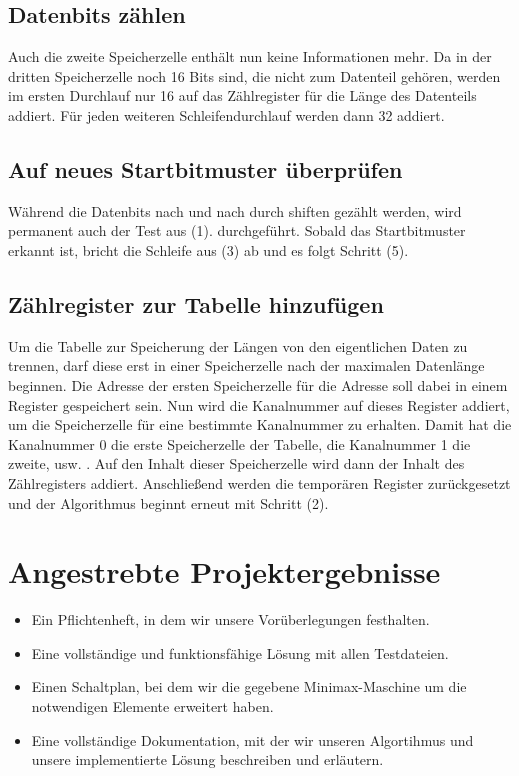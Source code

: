 \documentclass[12pt,titlepage,german,a4]{article}
\begin{document}
    \subsection{Datenbits z{\"a}hlen}
    Auch die zweite Speicherzelle enth{\"a}lt nun keine Informationen mehr. Da in der dritten Speicherzelle noch 16 Bits sind, die nicht zum Datenteil geh{\"o}ren, werden im ersten Durchlauf nur 16 auf das Z{\"a}hlregister f{\"u}r die L{\"a}nge des Datenteils addiert. F{\"u}r jeden weiteren Schleifendurchlauf werden dann 32 addiert.

    \subsection{Auf neues Startbitmuster {\"u}berpr{\"u}fen}
    W{\"a}hrend die Datenbits nach und nach durch shiften gez{\"a}hlt werden, wird permanent auch der Test aus (1). durchgef{\"u}hrt. Sobald das Startbitmuster erkannt ist, bricht die Schleife aus (3) ab und es folgt Schritt (5).

    \subsection{Z{\"a}hlregister zur Tabelle hinzuf{\"u}gen}
    Um die Tabelle zur Speicherung der L{\"a}ngen von den eigentlichen Daten zu trennen, darf diese erst in einer Speicherzelle nach der maximalen Datenl{\"a}nge beginnen. Die Adresse der ersten Speicherzelle f{\"u}r die Adresse soll dabei in einem Register gespeichert sein. Nun wird die Kanalnummer auf dieses Register addiert, um die Speicherzelle f{\"u}r eine bestimmte Kanalnummer zu erhalten. Damit hat die Kanalnummer 0 die erste Speicherzelle der Tabelle, die Kanalnummer 1 die zweite, usw. . Auf den Inhalt dieser Speicherzelle wird dann der Inhalt des Z{\"a}hlregisters addiert. Anschlie{\ss}end werden die tempor{\"a}ren Register zur{\"u}ckgesetzt und der Algorithmus beginnt erneut mit Schritt (2).

    \newpage

    \section{Angestrebte Projektergebnisse}
        \begin{itemize}
			\item Ein Pflichtenheft, in dem wir unsere Vor{\"u}berlegungen festhalten.
			\item Eine vollst{\"a}ndige und funktionsf{\"a}hige L{\"o}sung mit allen Testdateien.
			\item Einen Schaltplan, bei dem wir die gegebene Minimax-Maschine um die notwendigen Elemente erweitert haben.
			\item Eine vollst{\"a}ndige Dokumentation, mit der wir unseren Algortihmus und unsere implementierte L{\"o}sung beschreiben und erl{\"a}utern.
        \end{itemize}
\end{document}
